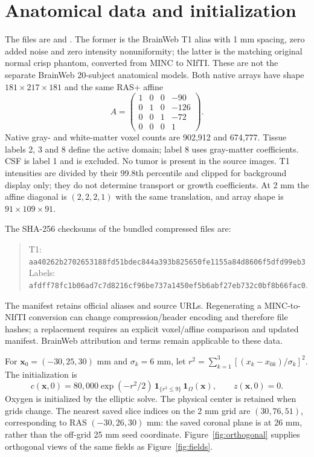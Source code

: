 \section{Anatomical data and initialization}\label{app:data}
The files are  and . The former is the BrainWeb T1 alias with 1 mm spacing, zero added noise and zero intensity nonuniformity; the latter is the matching original normal crisp phantom, converted from MINC to NIfTI. These are not the separate BrainWeb 20-subject anatomical models. Both native arrays have shape $181\times217\times181$ and the same RAS+ affine
\begin{equation}
 A=\begin{pmatrix}1&0&0&-90\\0&1&0&-126\\0&0&1&-72\\0&0&0&1\end{pmatrix}.
\end{equation}
Native gray- and white-matter voxel counts are 902,912 and 674,777. Tissue labels 2, 3 and 8 define the active domain; label 8 uses gray-matter coefficients. CSF is label 1 and is excluded. No tumor is present in the source images. T1 intensities are divided by their 99.8th percentile and clipped for background display only; they do not determine transport or growth coefficients. At 2 mm the affine diagonal is $(2,2,2,1)$ with the same translation, and array shape is $91\times109\times91$.

The SHA-256 checksums of the bundled compressed files are:
\begin{quote}\footnotesize
T1: \nolinkurl{aa40262b2702653188fd51bdec844a393b825650fe1155a84d8606f5dfd99eb3}\\
Labels: \nolinkurl{afdff78fc1b06ad7c7d8216cf96be737a1450ef5b6abf27eb732c0bf8b66fac0}.
\end{quote}
The manifest retains official aliases and source URLs. Regenerating a MINC-to-NIfTI conversion can change compression/header encoding and therefore file hashes; a replacement requires an explicit voxel/affine comparison and updated manifest. BrainWeb attribution and terms remain applicable to these data.

For $\bm{x}_0=(-30,25,30)$ mm and $\sigma_k=6$ mm, let $r^2=\sum_{k=1}^{3}[(x_k-x_{0k})/\sigma_k]^2$. The initialization is
\begin{equation}
 c(\bm{x},0)=80{,}000\exp(-r^2/2)\,\mathbf{1}_{\{r^2\leq9\}}\,\mathbf{1}_{\Omega}(\bm{x}),\qquad z(\bm{x},0)=0 .
\end{equation}
Oxygen is initialized by the elliptic solve. The physical center is retained when grids change. The nearest saved slice indices on the 2 mm grid are $(30,76,51)$, corresponding to RAS $(-30,26,30)$ mm: the saved coronal plane is at 26 mm, rather than the off-grid 25 mm seed coordinate. Figure~\ref{fig:orthogonal} supplies orthogonal views of the same fields as Figure~\ref{fig:fields}.

